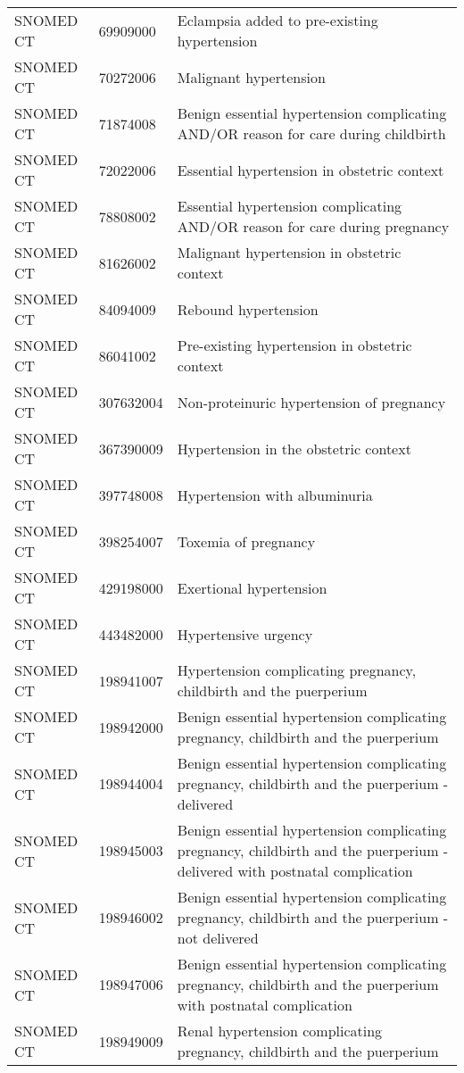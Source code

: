 \begin{longtable}{p{}p{}p{}}
  SNOMED CT & 69909000 & Eclampsia added to pre-existing hypertension \\ 
  SNOMED CT & 70272006 & Malignant hypertension \\ 
  SNOMED CT & 71874008 & Benign essential hypertension complicating AND/OR reason for care during childbirth \\ 
  SNOMED CT & 72022006 & Essential hypertension in obstetric context \\ 
  SNOMED CT & 78808002 & Essential hypertension complicating AND/OR reason for care during pregnancy \\ 
  SNOMED CT & 81626002 & Malignant hypertension in obstetric context \\ 
  SNOMED CT & 84094009 & Rebound hypertension \\ 
  SNOMED CT & 86041002 & Pre-existing hypertension in obstetric context \\ 
  SNOMED CT & 307632004 & Non-proteinuric hypertension of pregnancy \\ 
  SNOMED CT & 367390009 & Hypertension in the obstetric context \\ 
  SNOMED CT & 397748008 & Hypertension with albuminuria \\ 
  SNOMED CT & 398254007 & Toxemia of pregnancy \\ 
  SNOMED CT & 429198000 & Exertional hypertension \\ 
  SNOMED CT & 443482000 & Hypertensive urgency \\ 
  SNOMED CT & 198941007 & Hypertension complicating pregnancy, childbirth and the puerperium \\ 
  SNOMED CT & 198942000 & Benign essential hypertension complicating pregnancy, childbirth and the puerperium \\ 
  SNOMED CT & 198944004 & Benign essential hypertension complicating pregnancy, childbirth and the puerperium - delivered \\ 
  SNOMED CT & 198945003 & Benign essential hypertension complicating pregnancy, childbirth and the puerperium - delivered with postnatal complication \\ 
  SNOMED CT & 198946002 & Benign essential hypertension complicating pregnancy, childbirth and the puerperium - not delivered \\ 
  SNOMED CT & 198947006 & Benign essential hypertension complicating pregnancy, childbirth and the puerperium with postnatal complication \\ 
  SNOMED CT & 198949009 & Renal hypertension complicating pregnancy, childbirth and the puerperium \\ 

\end{longtable}
